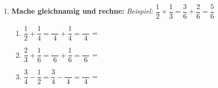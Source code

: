 \begin{enumerate}[label=\arabic*.]
    \item \textbf{Mache gleichnamig und rechne:}
    \textit{Beispiel:} $\dfrac{1}{2} + \dfrac{1}{3} = \dfrac{3}{6} + \dfrac{2}{6} = \dfrac{5}{6}$
    \vspace{0.5cm}
    \begin{enumerate}[label=\alph*)]
        \item $\dfrac{1}{2} + \dfrac{1}{4} = \dfrac{\phantom{00}}{4} + \dfrac{1}{4} = \dfrac{\phantom{00}}{4}$ = \underline{\hspace{3cm}}
        \vspace{0.5cm}
        \item $\dfrac{2}{3} + \dfrac{1}{6} = \dfrac{\phantom{00}}{6} + \dfrac{1}{6} = \dfrac{\phantom{00}}{6}$ = \underline{\hspace{3cm}}
        \vspace{0.5cm}
        \item $\dfrac{3}{4} - \dfrac{1}{2} = \dfrac{3}{4} - \dfrac{\phantom{00}}{4} = \dfrac{\phantom{00}}{4}$ = \underline{\hspace{3cm}}
    \end{enumerate}
\end{enumerate}